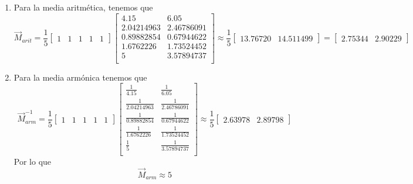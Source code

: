 \documentclass[]{article}
\begin{document}
    \begin{enumerate}
        \item {
            Para la media aritmética, tenemos que 
            \[\vec{M}_{arit} = 
            \frac{1}{5}
            \begin{bmatrix}
                1 & 1 & 1 & 1 & 1
            \end{bmatrix}
            \begin{bmatrix}
                4.15 & 6.05 \\
                2.04214963 & 2.46786091 \\
                0.89882854 & 0.67944622 \\
                1.6762226 & 1.73524452 \\
                5 & 3.57894737 \\
            \end{bmatrix}
            \approx
            \frac{1}{5}
            \begin{bmatrix}
                13.76720 & 14.511499
            \end{bmatrix}
            = 
            \begin{bmatrix}
                2.75344 & 2.90229
            \end{bmatrix}
            \]
        }
        \item {
            Para la media armónica tenemos que 
            \[\vec{M}_{arm}^{-1} = 
            \frac{1}{5}
            \begin{bmatrix}
                1 & 1 & 1 & 1 & 1
            \end{bmatrix}
            \begin{bmatrix}
                \frac{1}{4.15} & \frac{1}{6.05} \\
                \frac{1}{2.04214963} & \frac{1}{2.46786091} \\
                \frac{1}{0.89882854} & \frac{1}{0.67944622} \\
                \frac{1}{1.6762226} & \frac{1}{1.73524452} \\
                \frac{1}{5} & \frac{1}{3.57894737} \\
            \end{bmatrix}
            \approx
            \frac{1}{5}
            \begin{bmatrix}
                2.63978 & 2.89798
            \end{bmatrix}
            \]
            Por lo que 
            \[\vec{M}_{arm} \approx
            5 
\]}
\end{enumerate}
\end{document}
